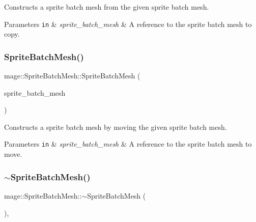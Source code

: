 Constructs a sprite batch mesh from the given sprite batch mesh.


\begin{DoxyParams}[1]{Parameters}
\mbox{\tt in}  & {\em sprite\+\_\+batch\+\_\+mesh} & A reference to the sprite batch mesh to copy. \\
\hline
\end{DoxyParams}
\hypertarget{classmage_1_1_sprite_batch_mesh_ae577b9b1f38ab5748c35675135da1e3e}{}\label{classmage_1_1_sprite_batch_mesh_ae577b9b1f38ab5748c35675135da1e3e} 
\subsubsection{\texorpdfstring{Sprite\+Batch\+Mesh()}{SpriteBatchMesh()}\hspace{0.1cm}{\footnotesize\ttfamily [4/4]}}
{\footnotesize\ttfamily mage\+::\+Sprite\+Batch\+Mesh\+::\+Sprite\+Batch\+Mesh (\begin{DoxyParamCaption}\item[{\hyperlink{classmage_1_1_sprite_batch_mesh}{Sprite\+Batch\+Mesh} \&\&}]{sprite\+\_\+batch\+\_\+mesh }\end{DoxyParamCaption})\hspace{0.3cm}{\ttfamily [default]}}

Constructs a sprite batch mesh by moving the given sprite batch mesh.


\begin{DoxyParams}[1]{Parameters}
\mbox{\tt in}  & {\em sprite\+\_\+batch\+\_\+mesh} & A reference to the sprite batch mesh to move. \\
\hline
\end{DoxyParams}
\hypertarget{classmage_1_1_sprite_batch_mesh_a4f9ad5d0d58722499b9e7ddfac3312c9}{}\label{classmage_1_1_sprite_batch_mesh_a4f9ad5d0d58722499b9e7ddfac3312c9} 
\subsubsection{\texorpdfstring{$\sim$\+Sprite\+Batch\+Mesh()}{~SpriteBatchMesh()}}
{\footnotesize\ttfamily mage\+::\+Sprite\+Batch\+Mesh\+::$\sim$\+Sprite\+Batch\+Mesh (\begin{DoxyParamCaption}{ }\end{DoxyParamCaption})\hspace{0.3cm}{\ttfamily [virtual]}, {\ttfamily [default]}}

